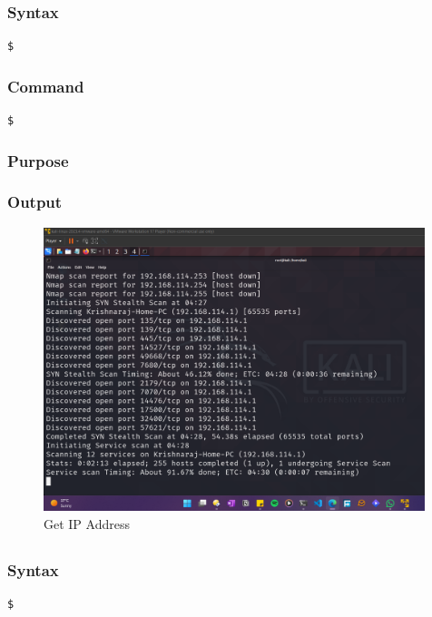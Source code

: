 \documentclass[11pt]{article}
\begin{document}
\subsubsection*{Syntax}
\begin{verbatim}
$
\end{verbatim}

\subsubsection*{Command}
\begin{verbatim}
$
\end{verbatim}

\subsubsection*{Purpose}

\subsubsection*{Output}
\begin{figure}[H]
    \centering
    \includegraphics[width=0.99\textwidth]{a4.png}
    \caption{Get IP Address}
    \label{fig:1}
\end{figure}

\subsection{}

\subsubsection*{Syntax}
\begin{verbatim}
$
\end{verbatim}
\end{document}
